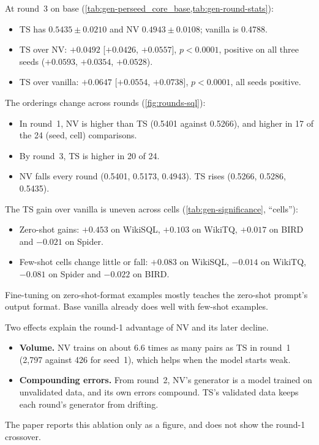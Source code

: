 \begin{observation}
At round~3 on base (\cref{tab:gen-perseed_core_base,tab:gen-round-stats}):
\begin{itemize}
\item TS has \Mviii{} $0.5435\pm0.0210$ and NV $0.4943\pm0.0108$; vanilla is 0.4788.
\item TS over NV: $+0.0492$ [$+0.0426$, $+0.0557$], $p<0.0001$, positive on all three seeds ($+0.0593$, $+0.0354$,
$+0.0528$).
\item TS over vanilla: $+0.0647$ [$+0.0554$, $+0.0738$], $p<0.0001$, all seeds positive.
\end{itemize}
The orderings change across rounds (\cref{fig:rounds-sql}):
\begin{itemize}
\item In round~1, NV is higher than TS (0.5401 against 0.5266), and higher in 17 of the 24 (seed, cell) comparisons.
\item By round~3, TS is higher in 20 of 24.
\item NV falls every round (0.5401, 0.5173, 0.4943). TS rises (0.5266, 0.5286, 0.5435).
\end{itemize}
\end{observation}

The TS gain over vanilla is uneven across cells (\cref{tab:gen-significance}, ``cells''):
\begin{itemize}
\item Zero-shot gains: $+0.453$ on WikiSQL, $+0.103$ on WikiTQ, $+0.017$ on BIRD and $-0.021$ on Spider.
\item Few-shot cells change little or fall: $+0.083$ on WikiSQL, $-0.014$ on WikiTQ, $-0.081$ on Spider and $-0.022$
on BIRD.
\end{itemize}
Fine-tuning on zero-shot-format examples mostly teaches the zero-shot prompt's output format. Base vanilla already does
well with few-shot examples.

\begin{interpretation}
Two effects explain the round-1 advantage of NV and its later decline.
\begin{itemize}
\item \textbf{Volume.} NV trains on about 6.6 times as many pairs as TS in round~1 (2,797 against 426 for seed~1),
which helps when the model starts weak.
\item \textbf{Compounding errors.} From round~2, NV's generator is a model trained on unvalidated data, and its own
errors compound. TS's validated data keeps each round's generator from drifting.
\end{itemize}
The paper reports this ablation only as a figure, and does not show the round-1 crossover.
\end{interpretation}

